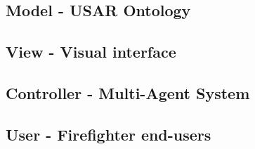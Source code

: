 \subsection{Model - USAR Ontology}

\subsection{View - Visual interface}

\subsection{Controller - Multi-Agent System}

\subsection{User - Firefighter end-users}
  